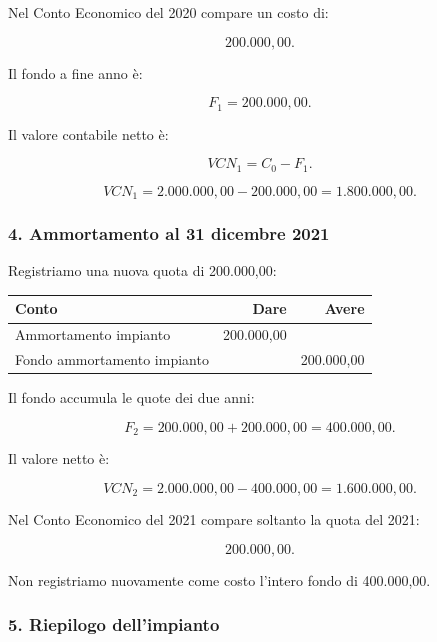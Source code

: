 \noindent Nel Conto Economico del 2020
compare un costo di:

\[
\boxed{200.000{,}00}.
\]

\noindent Il fondo a fine anno è:

\[
F_1=200.000{,}00.
\]

\noindent Il valore contabile netto è:

\[
VCN_1=C_0-F_1.
\]

\[
VCN_1=
2.000.000{,}00-200.000{,}00
=
\boxed{1.800.000{,}00}.
\]


\subsubsection*{4. Ammortamento al 31 dicembre 2021}

\noindent Registriamo una nuova quota
di 200.000,00:

\begin{center}
    \begin{tabular}{|l|r|r|}
        \hline
        \textbf{Conto}
        & \textbf{Dare}
        & \textbf{Avere} \\
        \hline
        Ammortamento impianto
        & 200.000,00 & \\
        Fondo ammortamento impianto
        & & 200.000,00 \\
        \hline
    \end{tabular}
\end{center}

\noindent Il fondo accumula
le quote dei due anni:

\[
F_2=200.000{,}00+200.000{,}00
=
\boxed{400.000{,}00}.
\]

\noindent Il valore netto è:

\[
VCN_2=
2.000.000{,}00-400.000{,}00
=
\boxed{1.600.000{,}00}.
\]

\noindent Nel Conto Economico del 2021
compare soltanto la quota del 2021:

\[
\boxed{200.000{,}00}.
\]

\noindent Non registriamo nuovamente
come costo l'intero fondo di 400.000,00.


\subsubsection*{5. Riepilogo dell'impianto}

